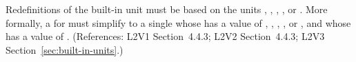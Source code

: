 Redefinitions of the built-in unit  must be based on the
units , , , , or
.  More formally, a \UnitDefinition for
 must simplify to a single \Unit whose  
has a value of , , , , or
, and whose   has a value of
.  (References: L2V1 Section~4.4.3; L2V2 Section~4.4.3; L2V3
Section~\ref{sec:built-in-units}.)
